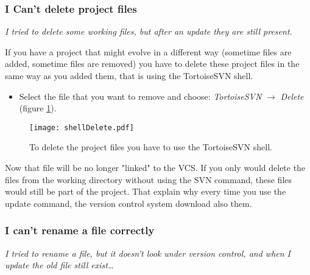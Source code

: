 \subsubsection{I Can't delete project files}
\label{subsubsection:DeleteProjectFiles}

\textit{I tried to delete some working files, but after an update they are still present.}\newline


If you have a project that might evolve in a different way (sometime files are added, sometime files are removed) you have to delete these project files in the same way as you added them, that is using the TortoiseSVN shell.

\begin{itemize}
    
    \item Select the file that you want to remove and choose: \textit{TortoiseSVN} $\rightarrow$ \textit{Delete} (figure \ref{fig:shellDelete}).
    
\end{itemize}



\begin{figure}[ht!]
    \centering
    \texttt{[image: shellDelete.pdf]}
    \caption{To delete the project files you have to use the TortoiseSVN shell.}
    \label{fig:shellDelete}
\end{figure}


Now that file will be no longer "linked" to the VCS. If you only would delete the files from the working directory without using the SVN command, these files would still be part of the project. That explain why every time you use the update command, the version control system download also them.





\subsubsection{I can't rename a file correctly}
\label{subsubsection:RenameFile}

\textit{I tried to rename a file, but it doesn't look under version control, and when I update the old file still exist\ldots}\newline

